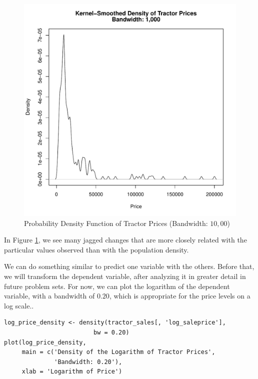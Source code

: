 \begin{figure}[h!]
  \centering
  \includegraphics[scale = 0.5, keepaspectratio=true]{../Figures/density_saleprice_bw1000}
  \caption{Probability Density Function of Tractor Prices (Bandwidth: $10,00$)} \label{fig:density_saleprice_bw1000}
\end{figure}

In Figure \ref{fig:density_saleprice_bw1000},
we see many jagged changes that are more closely related
with the particular values observed
than with the population density.

\pagebreak
We can do something similar to predict one variable
with the others.
Before that, we will transform the dependent variable,
after analyzing it in greater detail in future problem sets.
For now, we can plot the logarithm of the dependent variable,
with a bandwidth of $0.20$, which is appropriate for the price levels on a log scale..


\begin{verbatim}
log_price_density <- density(tractor_sales[, 'log_saleprice'],
                         bw = 0.20)
plot(log_price_density,
     main = c('Density of the Logarithm of Tractor Prices',
              'Bandwidth: 0.20'),
     xlab = 'Logarithm of Price')
\end{verbatim}

